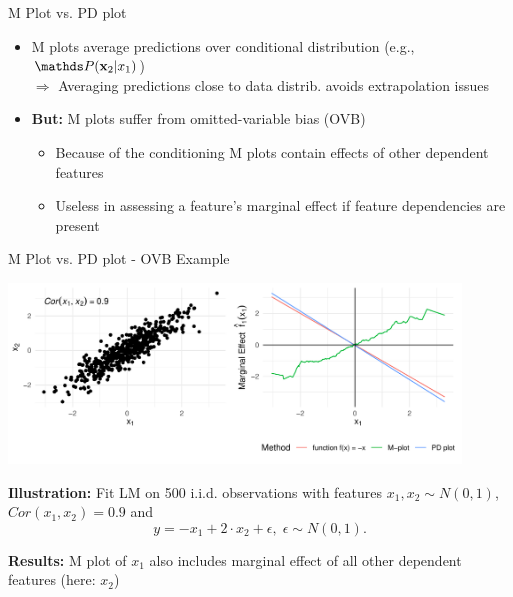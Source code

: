 \documentclass[10pt,compress,t,notes=noshow, xcolor=table]{beamer}
\begin{document}
\begin{frame}{M Plot vs. PD plot}
\begin{itemize}
    \item M plots average predictions over conditional distribution (e.g., $\P(\xv_2|x_1)$)\\
    $\Rightarrow$ Averaging predictions close to data distrib. avoids extrapolation issues
    \item \textbf{But:} M plots suffer from omitted-variable bias (OVB)
\begin{itemize}
\item Because of the conditioning M plots contain effects of other dependent features
\item Useless in assessing a feature's marginal effect if feature dependencies are present
\end{itemize}
\end{itemize}


\end{frame}

\begin{frame}{M Plot vs. PD plot - OVB Example}

\begin{center}
\includegraphics[width=0.9\textwidth]{figure/pd_vs_mplot}
\end{center}

\textbf{Illustration:} Fit LM on 500 i.i.d. observations with features $x_1, x_2 \sim N(0,1)$, $Cor(x_1, x_2) = 0.9$ and $$y = -x_1 + 2 \cdot x_2 + \epsilon, \; \epsilon \sim N(0,1).$$

\textbf{Results:} M plot of $x_1$ also includes marginal effect of all other dependent features (here: $x_2$)
\end{frame}
\end{document}
